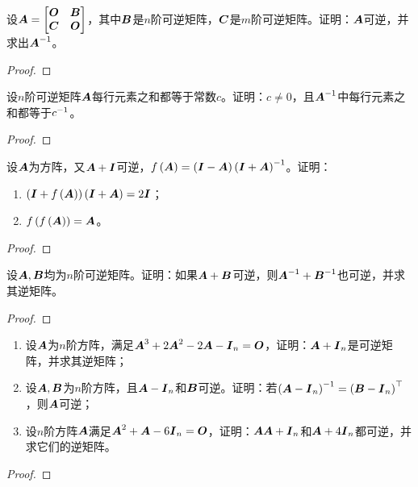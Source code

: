 \begin{problem}\label{problem-2.43}
设\(\boldsymbol{A}=\begin{bmatrix}\boldsymbol{O}&\boldsymbol{B}\\\boldsymbol{C}&\boldsymbol{O}\end{bmatrix}\)，其中\(\boldsymbol{B}\)是\(n\)阶可逆矩阵，\(\boldsymbol{C}\)是\(m\)阶可逆矩阵。证明：\(\boldsymbol{A}\)可逆，并求出\({\boldsymbol{A}}^{-1}\)。
\end{problem}
\begin{proof}
\end{proof}

\begin{problem}\label{problem-2.44}
设\(n\)阶可逆矩阵\(\boldsymbol{A}\)每行元素之和都等于常数\(c\)。证明：\(c\neq0\)，且\({\boldsymbol{A}}^{-1}\)中每行元素之和都等于\({c}^{-1}\)。
\end{problem}
\begin{proof}
\end{proof}

\begin{problem}\label{problem-2.45}
设\(\boldsymbol{A}\)为方阵，又\(\boldsymbol{A}+\boldsymbol{I}\)可逆，\(f\left( \boldsymbol{A} \right)=\left( \boldsymbol{I}-\boldsymbol{A} \right){\left( \boldsymbol{I}+\boldsymbol{A} \right)}^{-1}\)。证明：
\begin{enumerate}
    \item \(\left( \boldsymbol{I}+f\left( \boldsymbol{A} \right) \right)\left( \boldsymbol{I}+\boldsymbol{A} \right)=2\boldsymbol{I}\)；
    \item \(f\left( f\left( \boldsymbol{A} \right) \right)=\boldsymbol{A}\)。
\end{enumerate}
\end{problem}
\begin{proof}
\end{proof}

\begin{problem}\label{problem-2.46}
设\(\boldsymbol{A},\boldsymbol{B}\)均为\(n\)阶可逆矩阵。证明：如果\(\boldsymbol{A}+\boldsymbol{B}\)可逆，则\({\boldsymbol{A}}^{-1}+{\boldsymbol{B}}^{-1}\)也可逆，并求其逆矩阵。
\end{problem}
\begin{proof}
\end{proof}

\begin{problem}\label{problem-2.47}
\begin{enumerate}
    \item 设\(\boldsymbol{A}\)为\(n\)阶方阵，满足\(\boldsymbol{A}^3+2\boldsymbol{A}^2-2\boldsymbol{A}-\boldsymbol{I}_n=\boldsymbol{O}\)，证明：\(\boldsymbol{A}+\boldsymbol{I}_n\)是可逆矩阵，并求其逆矩阵；
    \item
          {
          设\(\boldsymbol{A},\boldsymbol{B}\)为\(n\)阶方阵，且\(\boldsymbol{A}-\boldsymbol{I}_n\)和\(\boldsymbol{B}\)可逆。证明：若\({\left( \boldsymbol{A}-\boldsymbol{I}_n \right)}^{-1}=\left( \boldsymbol{B}-\boldsymbol{I}_n \right)^\top\)，则\(\boldsymbol{A}\)可逆；
          }
    \item 设\(n\)阶方阵\(\boldsymbol{A}\)满足\(\boldsymbol{A}^2+\boldsymbol{A}-6\boldsymbol{I}_n=\boldsymbol{O}\)，证明：\(\boldsymbol{A}\boldsymbol{A}+\boldsymbol{I}_n\)和\(\boldsymbol{A}+4\boldsymbol{I}_n\)都可逆，并求它们的逆矩阵。
\end{enumerate}
\end{problem}
\begin{proof}
\end{proof}

